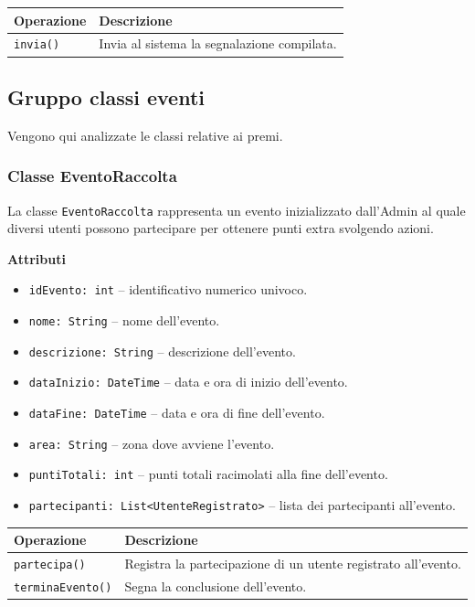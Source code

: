 \documentclass[12pt,a4paper]{article}
\begin{document}
\begin{table}[H]
\centering
\begin{tabularx}{\textwidth}{@{}lX@{}}
\toprule
\textbf{Operazione} & \textbf{Descrizione} \\ \midrule
\texttt{invia()} & Invia al sistema la segnalazione compilata. \\
\end{tabularx}
\end{table}

\subsection{Gruppo classi eventi} 
Vengono qui analizzate le classi relative ai premi.

\subsubsection{Classe EventoRaccolta}
La classe \texttt{EventoRaccolta} rappresenta un evento inizializzato dall'Admin al quale diversi utenti 
possono partecipare per ottenere punti extra svolgendo azioni.

\textbf{Attributi}
\begin{itemize}
    \item \texttt{idEvento: int} -- identificativo numerico univoco.
    \item \texttt{nome: String} -- nome dell'evento.
    \item \texttt{descrizione: String} -- descrizione dell'evento.
    \item \texttt{dataInizio: DateTime} -- data e ora di inizio dell'evento.
    \item \texttt{dataFine: DateTime} -- data e ora di fine dell'evento.
    \item \texttt{area: String} -- zona dove avviene l'evento.
    \item \texttt{puntiTotali: int} -- punti totali racimolati alla fine dell'evento.
    \item \texttt{partecipanti: List<\texttt{UtenteRegistrato}>} -- lista dei partecipanti all'evento.
\end{itemize}

\begin{table}[H]
\centering
\begin{tabularx}{\textwidth}{@{}lX@{}}
\toprule
\textbf{Operazione} & \textbf{Descrizione} \\ \midrule
\texttt{partecipa()} & Registra la partecipazione di un utente registrato all'evento. \\
\texttt{terminaEvento()} & Segna la conclusione dell'evento. \\
\end{tabularx}
\end{table}
\end{document}

